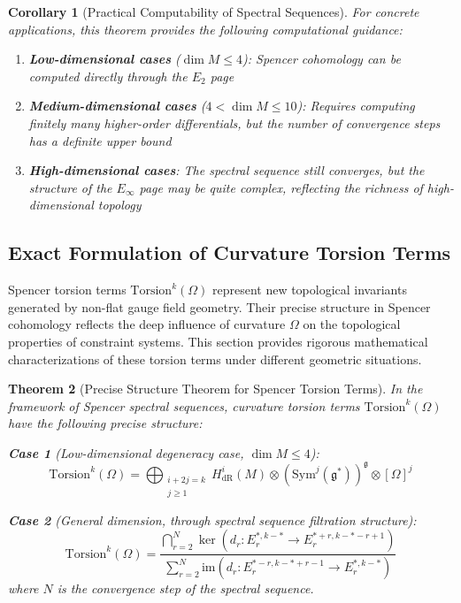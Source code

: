 \documentclass[a4paper,12pt]{extarticle}
\newtheorem{theorem}{Theorem}
\newtheorem{corollary}[theorem]{Corollary}
\theoremstyle{definition}
\begin{document}
\begin{corollary}[Practical Computability of Spectral Sequences]
For concrete applications, this theorem provides the following computational guidance:
\begin{enumerate}
\item \textbf{Low-dimensional cases} ($\dim M \leq 4$): Spencer cohomology can be computed directly through the $E_2$ page
\item \textbf{Medium-dimensional cases} ($4 < \dim M \leq 10$): Requires computing finitely many higher-order differentials, but the number of convergence steps has a definite upper bound
\item \textbf{High-dimensional cases}: The spectral sequence still converges, but the structure of the $E_\infty$ page may be quite complex, reflecting the richness of high-dimensional topology
\end{enumerate}
\end{corollary}



\subsection{Exact Formulation of Curvature Torsion Terms}

Spencer torsion terms $\text{Torsion}^k(\Omega)$ represent new topological invariants generated by non-flat gauge field geometry. Their precise structure in Spencer cohomology reflects the deep influence of curvature $\Omega$ on the topological properties of constraint systems. This section provides rigorous mathematical characterizations of these torsion terms under different geometric situations.

\begin{theorem}[Precise Structure Theorem for Spencer Torsion Terms]
In the framework of Spencer spectral sequences, curvature torsion terms $\text{Torsion}^k(\Omega)$ have the following precise structure:

\textbf{Case 1} (Low-dimensional degeneracy case, $\dim M \leq 4$):
$$\text{Torsion}^k(\Omega) = \bigoplus_{\substack{i+2j=k \\ j \geq 1}} H^i_{\text{dR}}(M) \otimes (\text{Sym}^j(\mathfrak{g}^*))^\mathfrak{g} \otimes [\Omega]^j$$

\textbf{Case 2} (General dimension, through spectral sequence filtration structure):
$$\text{Torsion}^k(\Omega) = \frac{\bigcap_{r=2}^N \ker(d_r: E_r^{*,k-*} \to E_r^{*+r, k-*-r+1})}{\sum_{r=2}^N \text{im}(d_r: E_r^{*-r, k-*+r-1} \to E_r^{*,k-*})}$$
where $N$ is the convergence step of the spectral sequence.
\end{theorem}
\end{document}
